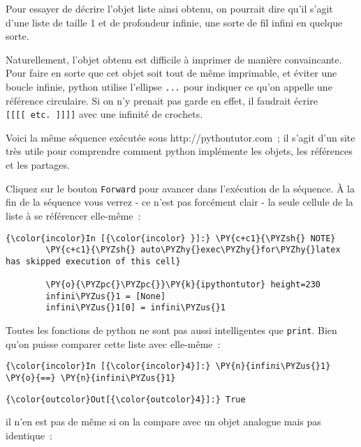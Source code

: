     Pour essayer de décrire l'objet liste ainsi obtenu, on pourrait dire
qu'il s'agit d'une liste de taille 1 et de profondeur infinie, une sorte
de fil infini en quelque sorte.

Naturellement, l'objet obtenu est difficile à imprimer de manière
convaincante. Pour faire en sorte que cet objet soit tout de même
imprimable, et éviter une boucle infinie, python utilise l'ellipse
\texttt{...} pour indiquer ce qu'on appelle une référence circulaire. Si
on n'y prenait pas garde en effet, il faudrait écrire
\texttt{{[}{[}{[}{[}\ etc.\ {]}{]}{]}{]}} avec une infinité de crochets.

    Voici la même séquence exécutée sous http://pythontutor.com~; il s'agit
d'un site très utile pour comprendre comment python implémente les
objets, les références et les partages.

Cliquez sur le bouton \texttt{Forward} pour avancer dans l'exécution de
la séquence. À la fin de la séquence vous verrez - ce n'est pas
forcément clair - la seule cellule de la liste à se référencer
elle-même~:

    \begin{Verbatim}[commandchars=\\\{\}]
{\color{incolor}In [{\color{incolor} }]:} \PY{c+c1}{\PYZsh{} NOTE}
        \PY{c+c1}{\PYZsh{} auto\PYZhy{}exec\PYZhy{}for\PYZhy{}latex has skipped execution of this cell}
        
        \PY{o}{\PYZpc{}\PYZpc{}}\PY{k}{ipythontutor} height=230
        infini\PYZus{}1 = [None]
        infini\PYZus{}1[0] = infini\PYZus{}1
\end{Verbatim}


    Toutes les fonctions de python ne sont pas aussi intelligentes que
\texttt{print}. Bien qu'on puisse comparer cette liste avec elle-même~:

    \begin{Verbatim}[commandchars=\\\{\}]
{\color{incolor}In [{\color{incolor}4}]:} \PY{n}{infini\PYZus{}1} \PY{o}{==} \PY{n}{infini\PYZus{}1}
\end{Verbatim}


\begin{Verbatim}[commandchars=\\\{\}]
{\color{outcolor}Out[{\color{outcolor}4}]:} True
\end{Verbatim}
            
    il n'en est pas de même si on la compare avec un objet analogue mais pas
identique~:

